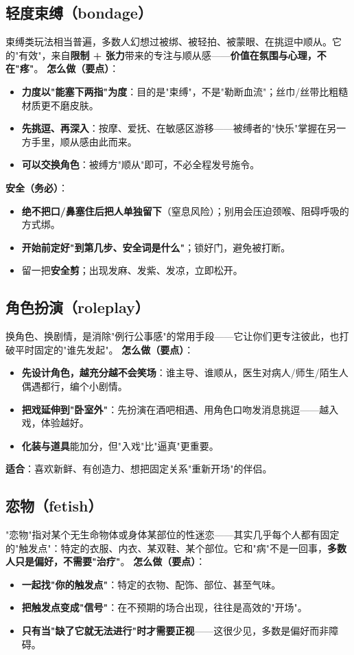\documentclass[12pt,UTF8,openany]{ctexbook}
\begin{document}
\subsection*{轻度束缚（bondage）}
束缚类玩法相当普遍，多数人幻想过被绑、被轻拍、被蒙眼、在挑逗中顺从。它的"有效"，来自\textbf{限制 + 张力}带来的专注与顺从感——\textbf{价值在氛围与心理，不在"疼"}。
\textbf{怎么做（要点）}：
\begin{itemize}[leftmargin=2em,itemsep=0.3em]
  \item \textbf{力度以"能塞下两指"为度}：目的是"束缚"，不是"勒断血流"；丝巾/丝带比粗糙材质更不磨皮肤。
  \item \textbf{先挑逗、再深入}：按摩、爱抚、在敏感区游移——被缚者的"快乐"掌握在另一方手里，顺从感由此而来。
  \item \textbf{可以交换角色}：被缚方"顺从"即可，不必全程发号施令。
\end{itemize}
\textbf{安全（务必）}：
\begin{itemize}[leftmargin=2em,itemsep=0.3em]
  \item \textbf{绝不把口/鼻塞住后把人单独留下}（窒息风险）；别用会压迫颈喉、阻碍呼吸的方式绑。
  \item \textbf{开始前定好"到第几步、安全词是什么"}；锁好门，避免被打断。
  \item 留一把\textbf{安全剪}；出现发麻、发紫、发凉，立即松开。
\end{itemize}
\subsection*{角色扮演（roleplay）}
换角色、换剧情，是消除"例行公事感"的常用手段——它让你们更专注彼此，也打破平时固定的"谁先发起"。
\textbf{怎么做（要点）}：
\begin{itemize}[leftmargin=2em,itemsep=0.3em]
  \item \textbf{先设计角色，越充分越不会笑场}：谁主导、谁顺从，医生对病人/师生/陌生人偶遇都行，编个小剧情。
  \item \textbf{把戏延伸到"卧室外"}：先扮演在酒吧相遇、用角色口吻发消息挑逗——越入戏，体验越好。
  \item \textbf{化装与道具}能加分，但"入戏"比"逼真"更重要。
\end{itemize}
\textbf{适合}：喜欢新鲜、有创造力、想把固定关系"重新开场"的伴侣。
\subsection*{恋物（fetish）}
"恋物"指对某个无生命物体或身体某部位的性迷恋——其实几乎每个人都有固定的"触发点"：特定的衣服、内衣、某双鞋、某个部位。它和"病"不是一回事，\textbf{多数人只是偏好，不需要"治疗"}。
\textbf{怎么做（要点）}：
\begin{itemize}[leftmargin=2em,itemsep=0.3em]
  \item \textbf{一起找"你的触发点"}：特定的衣物、配饰、部位、甚至气味。
  \item \textbf{把触发点变成"信号"}：在不预期的场合出现，往往是高效的"开场"。
  \item \textbf{只有当"缺了它就无法进行"时才需要正视}——这很少见，多数是偏好而非障碍。
\end{itemize}
\end{document}

